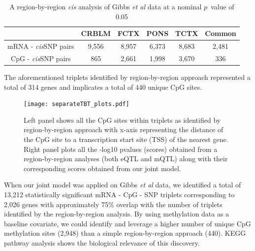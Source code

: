 \documentclass[hidelinks]{article}
\begin{document}
\begin{table}[!ht]
\begin{center}
\begin{tabular}{| c | c | c | c | c | c |}
\hline
& CRBLM & FCTX & PONS & TCTX & Common\\ \hline \hline
mRNA - \emph{cis}SNP pairs & 9,556 & 8,957 & 6,373 & 8,683 & 2,481 \\ \hline
CpG - \emph{cis}SNP pairs & 865 & 2,661 & 1,998 & 3,670 & 336 \\
\hline\hline
\end{tabular}
\end{center}
\caption{A region-by-region \emph{cis} analysis of Gibbs \emph{et al} data at a nominal $p$~value of 0.05}
\end{table}

The aforementioned triplets identified by region-by-region approach represented a total of 314 genes and implicates a total of 440 unique CpG sites. 

\begin{center}
\begin{figure}[!h]
\texttt{[image: separateTBT\_plots.pdf]}
\caption{Left panel shows all the CpG sites within triplets as identified by region-by-region approach with x-axis representing the distance of the CpG site to a transcription start site (TSS) of the nearest gene. Right panel plots all the -log10 pvalues (scores) obtained from a region-by-region analyses (both eQTL and mQTL) along with their corresponding scores obtained from our joint model.}
\end{figure}
\end{center}

When our joint model was applied on Gibbs \emph{et al} data, we identified a total of 13,212 statistically significant mRNA - CpG - SNP triplets corresponding to 2,026 genes with approximately 75\% overlap with the number of triplets identified by the region-by-region analysis. By using methylation data as a baseline covariate, we could identify and leverage a higher number of unique CpG methylation sites (2,948) than a simple region-by-region approach (440). KEGG pathway analysis shows the biological relevance of this discovery. 
\end{document}
